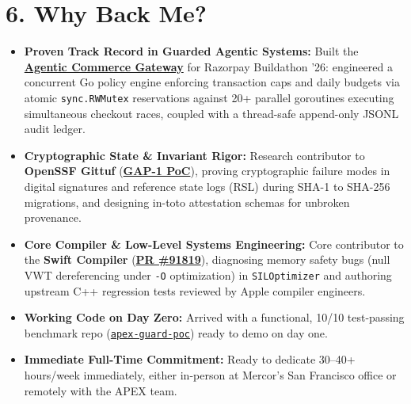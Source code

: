 \documentclass[10pt,a4paper]{article}
\begin{document}
\section*{6. Why Back Me?}
\begin{itemize}
    \item \textbf{Proven Track Record in Guarded Agentic Systems:} Built the \href{https://github.com/imshubham22apr-gif/agentic-commerce-gateway}{\textbf{Agentic Commerce Gateway}} for Razorpay Buildathon '26: engineered a concurrent Go policy engine enforcing transaction caps and daily budgets via atomic \texttt{sync.RWMutex} reservations against 20+ parallel goroutines executing simultaneous checkout races, coupled with a thread-safe append-only JSONL audit ledger.
    \item \textbf{Cryptographic State \& Invariant Rigor:} Research contributor to \textbf{OpenSSF Gittuf} (\href{https://github.com/imshubham22apr-gif/gittuf/tree/main/experimental/hash-agility-poc}{\textbf{GAP-1 PoC}}), proving cryptographic failure modes in digital signatures and reference state logs (RSL) during SHA-1 to SHA-256 migrations, and designing in-toto attestation schemas for unbroken provenance.
    \item \textbf{Core Compiler \& Low-Level Systems Engineering:} Core contributor to the \textbf{Swift Compiler} (\href{https://github.com/swiftlang/swift/pull/91819}{\textbf{PR \#91819}}), diagnosing memory safety bugs (null VWT dereferencing under \texttt{-O} optimization) in \texttt{SILOptimizer} and authoring upstream C++ regression tests reviewed by Apple compiler engineers.
    \item \textbf{Working Code on Day Zero:} Arrived with a functional, 10/10 test-passing benchmark repo (\href{https://github.com/imshubham22apr-gif/apex-guard-poc}{\texttt{apex-guard-poc}}) ready to demo on day one.
    \item \textbf{Immediate Full-Time Commitment:} Ready to dedicate 30--40+ hours/week immediately, either in-person at Mercor's San Francisco office or remotely with the APEX team.
\end{itemize}
\end{document}
